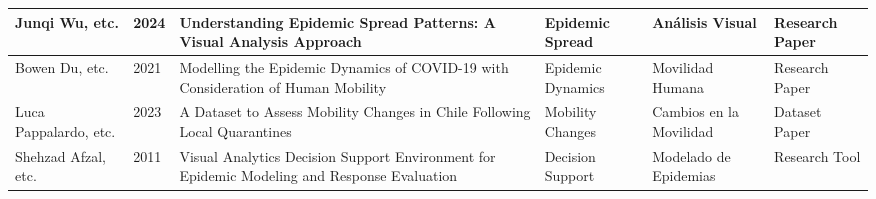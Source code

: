 \documentclass[sigconf]{acmart}
\begin{document}
\begin{table*}[h]
{\begin{tabular}{|p{2cm}|p{1cm}|p{4cm}|p{2.5cm}|p{3cm}|p{2cm}|}
Junqi Wu, etc. & 2024 & Understanding Epidemic Spread Patterns: A Visual Analysis Approach \cite{wu2024patterns} & Epidemic Spread & Análisis Visual & Research Paper \\ \hline
Bowen Du, etc. & 2021 & Modelling the Epidemic Dynamics of COVID-19 with Consideration of Human Mobility \cite{du2021dynamics} & Epidemic Dynamics & Movilidad Humana & Research Paper \\ \hline
Luca Pappalardo, etc. & 2023 & A Dataset to Assess Mobility Changes in Chile Following Local Quarantines \cite{pappalardo2023dataset} & Mobility Changes & Cambios en la Movilidad & Dataset Paper \\ \hline
Shehzad Afzal, etc. & 2011 & Visual Analytics Decision Support Environment for Epidemic Modeling and Response Evaluation \cite{afzal2011visual} & Decision Support & Modelado de Epidemias & Research Tool \\ \hline
\end{tabular}}
\end{table*}



\end{document}
